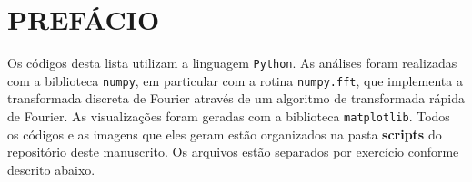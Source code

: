 
\chapter*{\large PREFÁCIO}

Os códigos desta lista utilizam a linguagem \texttt{Python}. As análises foram realizadas com a biblioteca \texttt{numpy}, em particular com a rotina \texttt{numpy.fft}, que implementa a transformada discreta de Fourier através de um algoritmo de transformada rápida de Fourier. As visualizações foram geradas com a biblioteca \texttt{matplotlib}. Todos os códigos e as imagens que eles geram estão organizados na pasta \textbf{scripts} do repositório deste manuscrito. Os arquivos estão separados por exercício conforme descrito abaixo.

